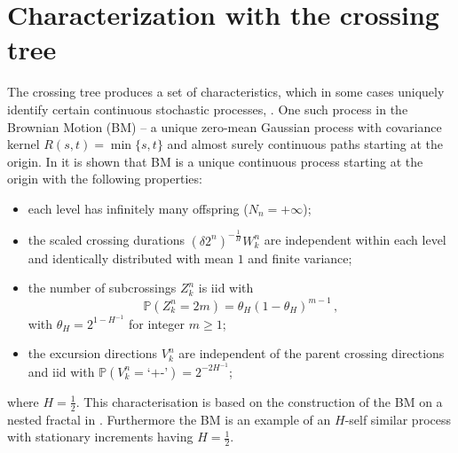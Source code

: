 \documentclass[a4paper]{article}
\newcommand{\pr}{\mathbb{P}}
\begin{document}


\section{Characterization with the crossing tree} %
\label{sec:characterization_with_the_crossing_tree}

The crossing tree produces a set of characteristics, which in some cases uniquely
identify certain continuous stochastic processes, \cite{ECP1673}. One such process
in the Brownian Motion (BM) -- a unique zero-mean Gaussian process with covariance
kernel $R(s,t)=\min\{s, t\}$ and almost surely continuous paths starting at the origin.
In \cite{ECP1673} it is shown that BM is a unique continuous process starting at
the origin with the following properties:
\begin{itemize}
    \item each level has infinitely many offspring ($N_n = +\infty$);
    \item the scaled crossing durations $(\delta 2^n)^{-\frac{1}{H}} W_k^n$
    are independent within each level and identically distributed with mean $1$
    and finite variance;
    \item the number of subcrossings $Z_k^n$ is iid with
    \begin{equation}\label{conj:subcross}
        \pr(Z_k^n = 2m) = \theta_H (1 - \theta_H)^{m-1} \,,
    \end{equation}
    with $\theta_H = 2^{1 - H^{-1}}$ for integer $m\geq 1$;
    \item the excursion directions $V_k^n$ are independent of the parent crossing
    directions and iid with $\pr(V_k^n=\text{`+-'}) = 2^{-2 H^{-1}}$;
\end{itemize}
where $H = \frac{1}{2}$. This characterisation is based on the construction of the
BM on a nested fractal in \cite{BarlowPerkins88}. Furthermore the BM is an example
of an $H$-self similar process with stationary increments having $H=\frac{1}{2}$.
\end{document}
